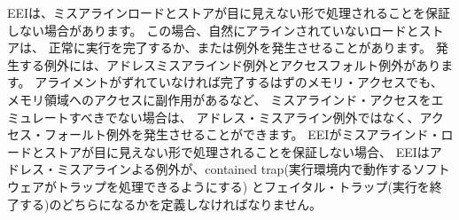 \begin{comment}
An EEI may not guarantee misaligned loads and stores are handled
invisibly.  In this case, loads and stores that are not naturally
aligned may either complete execution successfully or raise an
exception.  The exception raised can be either an address-misaligned
exception or an access-fault exception.  For a memory access that would
otherwise be able to complete except for the misalignment, an
access-fault exception can be raised instead of an address-misaligned
exception if the misaligned access should not be emulated, e.g., if
accesses to the memory region have side effects.  When an EEI does not
guarantee misaligned loads and stores are handled invisibly, the EEI
must define if exceptions caused by address misalignment result in a
contained trap (allowing software running inside the execution
environment to handle the trap) or a fatal trap (terminating
execution).
\end{comment}

EEIは、ミスアラインロードとストアが目に見えない形で処理されることを保証しない場合があります。 
この場合、自然にアラインされていないロードとストアは、
正常に実行を完了するか、または例外を発生させることがあります。
発生する例外には、アドレスミスアラインド例外とアクセスフォルト例外があります。 
アライメントがずれていなければ完了するはずのメモリ・アクセスでも、メモリ領域へのアクセスに副作用があるなど、
ミスアラインド・アクセスをエミュレートすべきでない場合は、
アドレス・ミスアライン例外ではなく、アクセス・フォールト例外を発生させることができます。 
EEIがミスアラインド・ロードとストアが目に見えない形で処理されることを保証しない場合、
EEIはアドレス・ミスアラインよる例外が、contained trap(実行環境内で動作するソフトウェアがトラップを処理できるようにする)
とフェイタル・トラップ(実行を終了する)のどちらになるかを定義しなければなりません。


